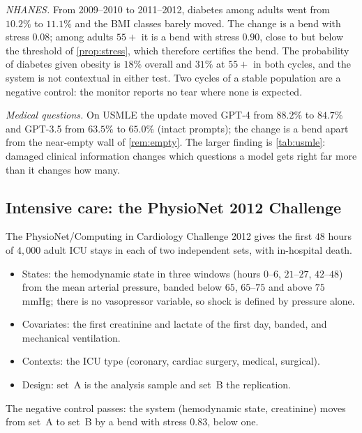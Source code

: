 \documentclass[11pt]{article}
\theoremstyle{definition}
\theoremstyle{remark}
\begin{document}
\emph{NHANES.} From 2009--2010 to 2011--2012, diabetes among adults went from $10.2\%$ to $11.1\%$ and the BMI classes barely moved. The
change is a bend with stress $0.08$; among adults $55+$ it is a bend with stress $0.90$, close to but below the threshold of
\cref{prop:stress}, which therefore certifies the bend. The probability of diabetes given obesity is $18\%$ overall and $31\%$ at $55+$ in
both cycles, and the system is not contextual in either test. Two cycles of a stable population are a negative control: the monitor reports
no tear where none is expected.

\emph{Medical questions.} On USMLE the update moved GPT-4 from $88.2\%$ to $84.7\%$ and GPT-3.5 from $63.5\%$ to $65.0\%$ (intact prompts);
the change is a bend apart from the near-empty wall of \cref{rem:empty}. The larger finding is \cref{tab:usmle}: damaged clinical
information changes which questions a model gets right far more than it changes how many.

\subsection{Intensive care: the PhysioNet 2012 Challenge}

The PhysioNet/Computing in Cardiology Challenge 2012 \cite{Silva2012,Goldberger2000} gives the first $48$ hours of $4{,}000$ adult ICU stays
in each of two independent sets, with in-hospital death.
\begin{itemize}[leftmargin=*,nosep]
\item States: the hemodynamic state in three windows (hours $0$--$6$, $21$--$27$, $42$--$48$) from the mean arterial pressure, banded
  below $65$, $65$--$75$ and above $75$ mmHg; there is no vasopressor variable, so shock is defined by pressure alone.
\item Covariates: the first creatinine and lactate of the first day, banded, and mechanical ventilation.
\item Contexts: the ICU type (coronary, cardiac surgery, medical, surgical).
\item Design: set~A is the analysis sample and set~B the replication.
\end{itemize}
The negative control passes: the system (hemodynamic state, creatinine) moves from set~A to set~B by a bend with stress $0.83$, below one.
\end{document}
